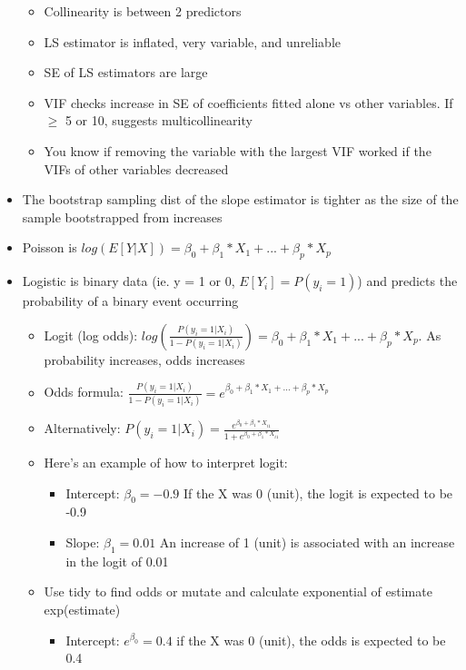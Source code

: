 \documentclass[8pt,landscape,a4paper, fleqn, dvipsnames]{extarticle}
\begin{document}
\begin{multicols*}{4}
\begin{itemize}
\begin{itemize}
        \item Collinearity is between 2 predictors
        \item LS estimator is inflated, very variable, and unreliable
        \item SE of LS estimators are large
        \item VIF checks increase in SE of coefficients fitted alone vs other variables. If $\geq$ 5 or 10, suggests multicollinearity
        \item You know if removing the variable with the largest VIF worked if the VIFs of other variables decreased
    \end{itemize}
    \item The bootstrap sampling dist of the slope estimator is tighter as the size of the sample bootstrapped from increases
    \item Poisson is $log(E[Y|X]) = \beta_0 + \beta_1*X_1 + ... + \beta_p * X_p$
    \item Logistic is binary data (ie. y = 1 or 0, $E[Y_i] = P(y_i = 1)$) and predicts the probability of a binary event occurring  
    \begin{itemize}
        \item Logit (log odds): $log(\frac{P(y_i = 1 | X_i)}{1 - P(y_i = 1 | X_i)}) = \beta_0 + \beta_1*X_1 + ... + \beta_p * X_p$. As probability increases, odds increases
        \item Odds formula: $\frac{P(y_i = 1 | X_i)}{1 - P(y_i = 1 | X_i)} = e^{\beta_0 + \beta_1*X_1 + ... + \beta_p * X_p}$
        \item Alternatively: $P(y_i = 1 | X_i) = \frac{e^{\beta_0 + \beta_1 * X_{i1}}}{1 + e^{\beta_0 + \beta_1 * X_{i1}}}$
        \item Here's an example of how to interpret logit:
        \begin{itemize}
            \item Intercept: $\beta_0 = -0.9$ If the X was 0 (unit), the logit is expected to be -0.9
            \item Slope: $\beta_1 = 0.01$ An increase of 1 (unit) is associated with an increase in the logit of 0.01
        \end{itemize}
        \item Use tidy to find odds or mutate and calculate exponential of estimate exp(estimate)
        \begin{itemize}
            \item Intercept: $e^{\beta_0} = 0.4$ if the X was 0 (unit), the odds is expected to be 0.4

\end{itemize}
\end{itemize}
\end{itemize}
\end{multicols*}
\end{document}
